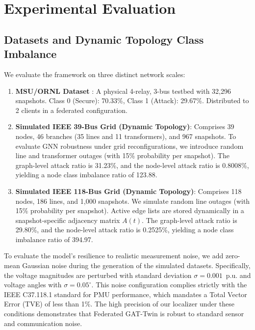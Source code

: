 \documentclass[10pt, a4paper, twocolumn]{article}
\begin{document}
\section{Experimental Evaluation}

\subsection{Datasets and Dynamic Topology Class Imbalance}
We evaluate the framework on three distinct network scales:
\begin{enumerate}
    \item \textbf{MSU/ORNL Dataset} \cite{msu_ornl_dataset}: A physical 4-relay, 3-bus testbed with 32,296 snapshots. Class 0 (Secure): 70.33\%, Class 1 (Attack): 29.67\%. Distributed to 2 clients in a federated configuration.
    \item \textbf{Simulated IEEE 39-Bus Grid (Dynamic Topology)}: Comprises 39 nodes, 46 branches (35 lines and 11 transformers), and 967 snapshots. To evaluate GNN robustness under grid reconfigurations, we introduce random line and transformer outages (with 15\% probability per snapshot). The graph-level attack ratio is 31.23\%, and the node-level attack ratio is 0.8008\%, yielding a node class imbalance ratio of 123.88.
    \item \textbf{Simulated IEEE 118-Bus Grid (Dynamic Topology)}: Comprises 118 nodes, 186 lines, and 1,000 snapshots. We simulate random line outages (with 15\% probability per snapshot). Active edge lists are stored dynamically in a snapshot-specific adjacency matrix $A(t)$. The graph-level attack ratio is 29.80\%, and the node-level attack ratio is 0.2525\%, yielding a node class imbalance ratio of 394.97.
\end{enumerate}

To evaluate the model's resilience to realistic measurement noise, we add zero-mean Gaussian noise during the generation of the simulated datasets. Specifically, the voltage magnitudes are perturbed with standard deviation $\sigma = 0.001$~p.u. and voltage angles with $\sigma = 0.05^{\circ}$. This noise configuration complies strictly with the IEEE C37.118.1 standard for PMU performance, which mandates a Total Vector Error (TVE) of less than 1\%. The high precision of our localizer under these conditions demonstrates that Federated GAT-Twin is robust to standard sensor and communication noise.
\end{document}
